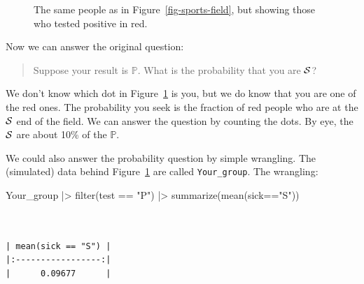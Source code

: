 \documentclass[
  letterpaper,
  DIV=11,
  numbers=noendperiod,
  oneside]{scrartcl}
\newenvironment{Shaded}{\begin{snugshade}}{\end{snugshade}}
\newcommand{\FunctionTok}[1]{\textcolor[rgb]{0.28,0.35,0.67}{#1}}
\newcommand{\NormalTok}[1]{\textcolor[rgb]{0.00,0.23,0.31}{#1}}
\newcommand{\SpecialCharTok}[1]{\textcolor[rgb]{0.37,0.37,0.37}{#1}}
\newcommand{\StringTok}[1]{\textcolor[rgb]{0.13,0.47,0.30}{#1}}
\newcommand*\circled[1]{\tikz[baseline=(char.base)]{
          \node[shape=circle,draw,inner sep=1pt] (char) {{\scriptsize#1}};}}
\begin{document}
\begin{figure}
\begin{minipage}{0.50\linewidth}
{}


\end{minipage}%

\caption{\label{fig-sports-field-test}The same people as in
Figure~\ref{fig-sports-field}, but showing those who tested positive in
red.}

\end{figure}%

Now we can answer the original question:

\begin{quote}
Suppose your result is \({\mathbb{P}}\). What is the probability that
you are \({\cal S}\)?
\end{quote}

We don't know which dot in Figure~\ref{fig-sports-field-test} is you,
but we do know that you are one of the red ones. The probability you
seek is the fraction of red people who are at the \({\cal S}\) end of
the field. We can answer the question by counting the dots. By eye, the
\({\cal S}\) are about 10\% of the \({\mathbb{P}}\).

We could also answer the probability question by simple wrangling. The
(simulated) data behind Figure~\ref{fig-sports-field-test} are called
\texttt{Your\_group}. The wrangling:

\label{annotated-cell-137}%
\begin{Shaded}
\begin{Highlighting}[]
\NormalTok{Your\_group }\SpecialCharTok{|\textgreater{}}
  \FunctionTok{filter}\NormalTok{(test }\SpecialCharTok{==} \StringTok{"P"}\NormalTok{) }\SpecialCharTok{|\textgreater{}} \hspace*{\fill}\NormalTok{\circled{1}}
  \FunctionTok{summarize}\NormalTok{(}\FunctionTok{mean}\NormalTok{(sick}\SpecialCharTok{==}\StringTok{"S"}\NormalTok{)) }\hspace*{\fill}\NormalTok{\circled{2}}
\end{Highlighting}
\end{Shaded}

\begin{verbatim}


| mean(sick == "S") |
|:-----------------:|
|      0.09677      |
\end{verbatim}
\end{document}
